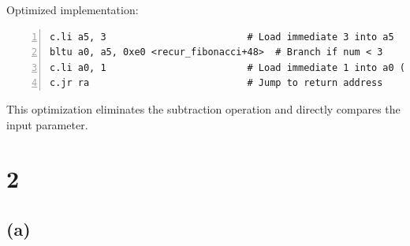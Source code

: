 \documentclass[12pt]{article}
\begin{document}
Optimized implementation:
\begin{lstlisting}[basicstyle=\ttfamily\small, numbers=left, numberstyle=\tiny\color{gray}, stepnumber=1, frame=single]
c.li a5, 3                         # Load immediate 3 into a5
bltu a0, a5, 0xe0 <recur_fibonacci+48>  # Branch if num < 3
c.li a0, 1                         # Load immediate 1 into a0 (return value)
c.jr ra                            # Jump to return address
\end{lstlisting}

This optimization eliminates the subtraction operation and directly compares the input parameter.

\section*{2}

\subsection*{(a)}
\end{document}
